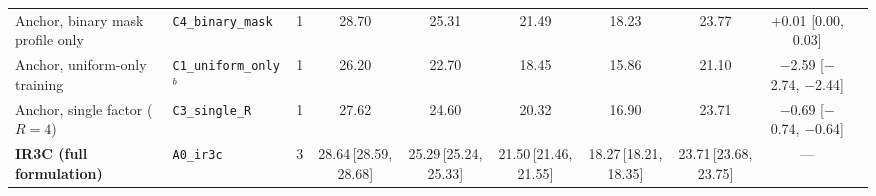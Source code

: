 \begin{table}[pos=t]
\begin{tabular*}{\textwidth}{@{\extracolsep{\fill}}llcccccccc@{}}
Anchor, binary mask profile only & \texttt{C4\_binary\_mask} & 1 & 28.70 & 25.31 & 21.49 & 18.23 & 23.77 & $+$0.01 [0.00, 0.03] \\
Anchor, uniform-only training & \texttt{C1\_uniform\_only}$^{b}$ & 1 & 26.20 & 22.70 & 18.45 & 15.86 & 21.10 & $-$2.59 [$-$2.74, $-$2.44] \\
Anchor, single factor ($R=4$) & \texttt{C3\_single\_R} & 1 & 27.62 & 24.60 & 20.32 & 16.90 & 23.71 & $-$0.69 [$-$0.74, $-$0.64] \\
\textbf{IR3C (full formulation)} & \texttt{A0\_ir3c} & 3 & 28.64\,{\scriptsize[28.59, 28.68]} & 25.29\,{\scriptsize[25.24, 25.33]} & 21.50\,{\scriptsize[21.46, 21.55]} & 18.27\,{\scriptsize[18.21, 18.35]} & 23.71\,{\scriptsize[23.68, 23.75]} & --- \\
\bottomrule
\end{tabular*}
\end{table}
